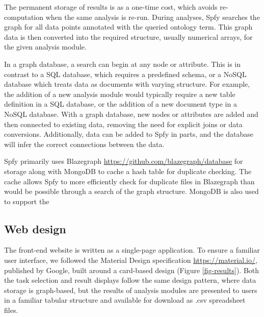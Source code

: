 \documentclass{article}
\begin{document}
The permanent storage of results is as a one-time cost, which avoids re-computation when the same analysis is re-run. During analyses, Spfy searches the graph for all data points annotated with the queried ontology term. This graph data is then converted into the required structure, usually numerical arrays, for the given analysis module.

In a graph database, a search can begin at any node or attribute. This is in contrast to a SQL database, which requires a predefined schema, or a NoSQL database which treats data as documents with varying structure.
For example, the addition of a new analysis module would typically require a new table definition in a SQL database, or the addition of a new document type in a NoSQL database. With a graph database, new nodes or attributes are added and then connected to existing data, removing the need for explicit joins or data conversions. Additionally, data can be added to Spfy in parts, and the database will infer the correct connections between the data.

Spfy primarily uses Blazegraph \url{https://github.com/blazegraph/database} for storage along with MongoDB to cache a hash table for duplicate checking.
The cache allows Spfy to more efficiently check for duplicate files in Blazegraph than would be possible through a search of the graph structure.
MongoDB is also used to support the 

\subsection{Web design}

The front-end website is written as a single-page application.
To ensure a familiar user interface, we followed the Material Design specification \url{https://material.io/}, published by Google, built around a card-based design (Figure \ref{fig-results}).
Both the task selection and result displays follow the same design pattern, where data storage is graph-based, but the results of analysis modules are presented to users in a familiar tabular structure and available for download as .csv spreadsheet files.
\end{document}
